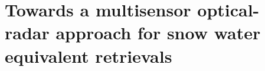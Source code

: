 \hypertarget{ch5-intro-2}{\section{Towards a multisensor optical-radar approach for snow water equivalent retrievals}\label{ch5-intro-2}}









